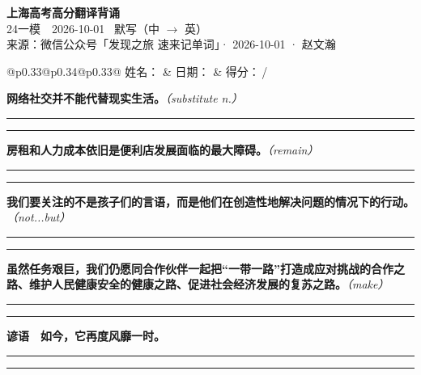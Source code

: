 \documentclass[11pt,a4paper]{article}
\newcommand{\num}[1]{\makebox[1.9em][r]{#1.}\hspace{0.3em}}
\newcommand{\wline}{\noindent\rule{\linewidth}{0.4pt}}
\newcommand{\prompt}[1]{\emph{\textcolor{tipblue}{\small（#1）}}}
\begin{document}
\pagestyle{plain}
\begin{center}
{\LARGE\bfseries 上海高考高分翻译背诵 }\\[0.25em]
{\large 24一模　2026-10-01 \quad\ 默写（中 $\to$ 英）}\\[0.35em]
{\footnotesize 来源：微信公众号「发现之旅 速来记单词」· 2026-10-01 · 赵文瀚}
\end{center}

\vspace{0.4em}
\noindent\begin{tabular}{@{}p{0.33\textwidth}@{}p{0.34\textwidth}@{}p{0.33\textwidth}@{}}
姓名：\underline{\hspace{2.0cm}} & 日期：\underline{\hspace{2.0cm}} & 得分：\underline{\hspace{1.4cm}}\,/ \\
\end{tabular}

\vspace{0.5em}

\vspace{0.8em}
\num{1}\textbf{网络社交并不能代替现实生活。}\prompt{substitute n.}

\vspace{0.3em}

\wline\vspace{0.3em}
\wline

\num{2}\textbf{房租和人力成本依旧是便利店发展面临的最大障碍。}\prompt{remain}

\vspace{0.3em}

\wline\vspace{0.3em}
\wline

\num{3}\textbf{我们要关注的不是孩子们的言语，而是他们在创造性地解决问题的情况下的行动。}\prompt{not...but}

\vspace{0.3em}

\wline\vspace{0.3em}
\wline

\num{4}\textbf{虽然任务艰巨，我们仍愿同合作伙伴一起把“一带一路”打造成应对挑战的合作之路、维护人民健康安全的健康之路、促进社会经济发展的复苏之路。}\prompt{make}

\vspace{0.3em}

\wline\vspace{0.3em}
\wline

\vspace{0.4em}\noindent{\color{rulegray}\rule{\textwidth}{0.6pt}}\vspace{0.4em}

\num{5}\textbf{谚语　如今，它再度风靡一时。}

\vspace{0.3em}

\wline\vspace{0.3em}
\wline
\end{document}
